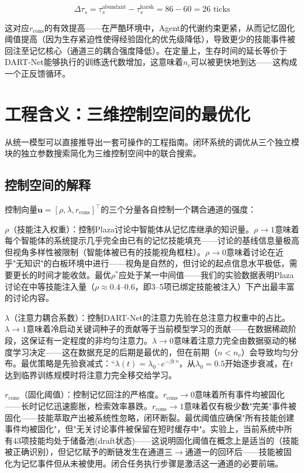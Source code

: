 \documentclass[twocolumn,10.5pt]{ctexart}
\begin{document}
\begin{equation}
\Delta \tau_s = \tau_s^{\text{abundant}} - \tau_s^{\text{harsh}} = 86 - 60 = 26 \text{ ticks}
\label{eq:tau_delta}
\end{equation}

这对应$r_{\text{cons}}$的有效提高——在严酷环境中，Agent的代谢约束更紧，从而记忆固化阈值提高（因为生存紧迫性使得经验固化的优先级降低），导致更少的技能事件被回注至记忆核心（通道三的耦合强度降低）。在定量上，生存时间的延长等价于DART-Net能够执行的训练迭代数增加，这意味着$n_c$可以被更快地到达——这构成一个正反馈循环。

\section{工程含义：三维控制空间的最优化}

从统一模型可以直接推导出一套可操作的工程指南。闭环系统的调优从三个独立模块的独立参数搜索简化为三维控制空间中的联合搜索。

\subsection{控制空间的解释}

控制向量$\mathbf{u} = [\rho, \lambda, r_{\text{cons}}]^\top$的三个分量各自控制一个耦合通道的强度：

$\rho$（技能注入权重）：控制Plaza讨论中智能体从记忆库继承的知识量。$\rho \to 1$意味着每个智能体的系统提示几乎完全由已有的记忆技能填充——讨论的基线信息量极高但视角多样性被限制（智能体被已有的技能视角框柱）。$\rho \to 0$意味着讨论在近乎"无知识"的白板环境中进行——视角是自然的，但讨论的起点信息水平极低，需要更长的时间才能收敛。最优$\rho^*$应处于某一中间值——我们的实验数据表明Plaza讨论在中等技能注入量（$\rho \approx 0.4\text{--}0.6$，即3--5项已绑定技能被注入）下产出最丰富的讨论内容。

$\lambda$（注意力耦合系数）：控制DART-Net的注意力先验在总注意力权重中的占比。$\lambda \to 1$意味着冷启动关键词种子的贡献等于当前模型学习的贡献——在数据稀疏阶段，这保证有一定程度的非均匀注意力。$\lambda \to 0$意味着注意力完全由数据驱动的梯度学习决定——这在数据充足的后期是最优的，但在前期（$n < n_c$）会导致均匀分布。最优策略是先验衰减式：“$\lambda(t) = \lambda_0 \cdot e^{-\beta t}$”，从$\lambda_0 = 0.5$开始逐步衰减，在$t$达到临界训练规模时将注意力完全移交给学习。

$r_{\text{cons}}$（固化阈值）：控制记忆回注的严格度。$r_{\text{cons}} \to 0$意味着所有事件均被固化——长时记忆迅速膨胀，检索效率暴跌。$r_{\text{cons}} \to 1$意味着仅有极少数"完美"事件被固化——技能萃取产出被系统性忽略，闭环断裂。最优阈值应确保"所有技能创建事件均被固化"，但"无关讨论事件被保留在短时缓存中"。实验上，当前系统中所有43项技能均处于储备池(draft状态)——这说明固化阈值在概念上是适当的（技能被正确识别），但记忆赋予的断链发生在通道三$\to$通道一的回环后——技能被固化为记忆事件但从未被使用。闭合任务执行步骤是激活这一通道的必要前端。
\end{document}
